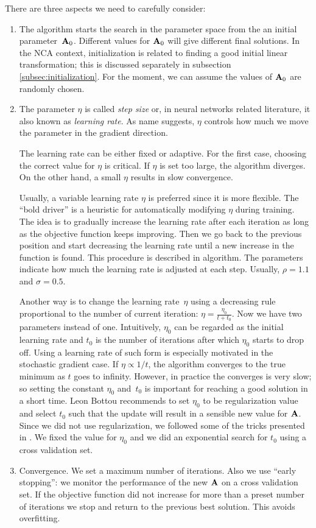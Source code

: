 	There are three aspects we need to carefully consider:
	\begin{enumerate}
	 \item The algorithm starts the search in the parameter space from the an initial parameter~$\mathbf{A}_0$. Different values for $\mathbf{A}_0$ will give different final solutions. In the NCA context, initialization is related to finding a good initial linear transformation; this is discussed  separately in subsection \ref{subsec:initialization}. For the moment, we can assume the values of $\mathbf{A}_0$ are randomly chosen.
	 \item The parameter $\eta$ is called \textit{step size} or, in neural networks related literature, it also known as \textit{learning rate}. As name suggests, $\eta$ controls how much we move the parameter in the gradient direction. 

	The learning rate can be either fixed or adaptive. For the first case, choosing the correct value for $\eta$ is critical. If $\eta$ is set too large, the algorithm diverges. On the other hand, a small $\eta$ results in slow convergence. 

	Usually, a variable learning rate $\eta$ is preferred since it is more flexible. The ``bold driver'' is a heuristic for automatically modifying $\eta$ during training. The idea is to gradually increase the learning rate after each iteration as long as the objective function keeps improving. Then we go back to the previous position and start decreasing the learning rate until a new increase in the function is found. This procedure is described in algorithm. The parameters indicate how much the learning rate is adjusted at each step. Usually, $\rho=1.1$ and $\sigma=0.5$.
	
	Another way is to change the learning rate~$\eta$ using a decreasing rule proportional to the number of current iteration: $\eta=\frac{\eta_0}{t+t_0}$. Now we have two parameters instead of one. Intuitively, $\eta_0$ can be regarded as the initial learning rate and $t_0$ is the number of iterations after which $\eta_0$ starts to drop off. Using a learning rate of such form is especially motivated in the stochastic gradient case. If $\eta\propto 1/t$, the algorithm converges to the true minimum as $t$ goes to infinity. However, in practice the converges is very slow; so setting the constant $\eta_0$ and~$t_0$ is important for reaching a good solution in a short time. Leon Bottou recommends to set $\eta_0$ to be regularization value and select $t_0$ such that the update will result in a sensible new value for $\mathbf{A}$. Since we did not use regularization, we followed some of the tricks presented in \citep{lecun1998}. We fixed the value for $\eta_0$ and we did an exponential search for $t_0$ using a cross validation set.

	 \item Convergence. We set a maximum number of iterations. Also we use ``early stopping'': we monitor the performance of the new $\mathbf{A}$ on a cross validation set. If the objective function did not increase for more than a preset number of iterations we stop and return to the previous best solution. This avoids overfitting.
	\end{enumerate}


